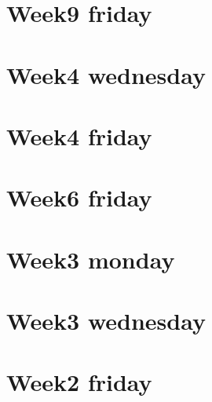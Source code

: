 
\section*{Week9 friday}

\vfill
\section*{Week4 wednesday}

\vfill
\section*{Week4 friday}

\vfill
\section*{Week6 friday}

\vfill
\section*{Week3 monday}

\vfill
\section*{Week3 wednesday}

\vfill
\section*{Week2 friday}

\vfill
